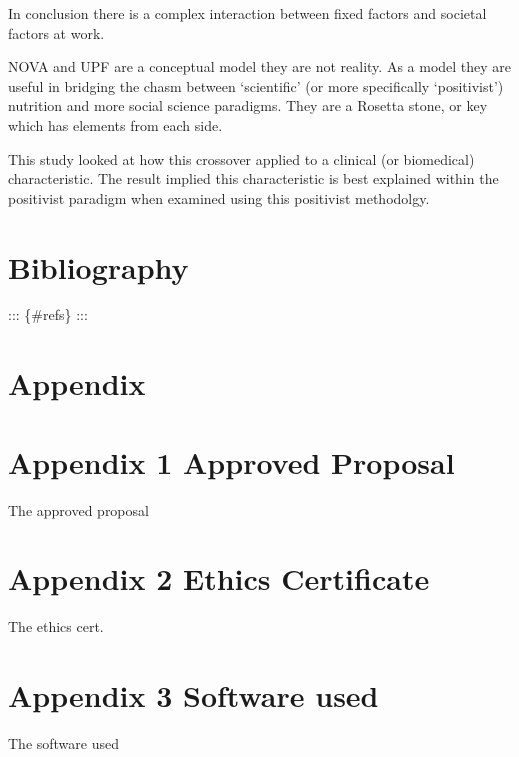 \documentclass[
]{article}
\begin{document}
In conclusion there is a complex interaction between fixed factors and
societal factors at work.

NOVA and UPF are a conceptual model they are not reality. As a model
they are useful in bridging the chasm between `scientific' (or more
specifically `positivist') nutrition and more social science paradigms.
They are a Rosetta stone, or key which has elements from each side.

This study looked at how this crossover applied to a clinical (or
biomedical) characteristic. The result implied this characteristic is
best explained within the positivist paradigm when examined using this
positivist methodolgy.

\newpage

\hypertarget{bibliography}{%
\section{Bibliography}\label{bibliography}}

::: \{\#refs\} :::

\hypertarget{appendix}{%
\section*{Appendix}\label{appendix}}

\hypertarget{appendix-1-approved-proposal}{%
\section{Appendix 1 Approved
Proposal}\label{appendix-1-approved-proposal}}

The approved proposal

\hypertarget{appendix-2-ethics-certificate}{%
\section{Appendix 2 Ethics
Certificate}\label{appendix-2-ethics-certificate}}

The ethics cert.

\hypertarget{appendix-3-software-used}{%
\section{Appendix 3 Software used}\label{appendix-3-software-used}}

The software used
\end{document}
